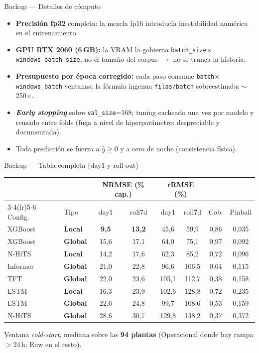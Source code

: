 \documentclass[10pt,aspectratio=169]{beamer}
\newcommand{\gl}[1]{\textcolor{glob}{\textbf{#1}}}
\newcommand{\lo}[1]{\textcolor{loc}{\textbf{#1}}}
\begin{document}
\begin{frame}{Backup --- Detalles de cómputo}
  \begin{itemize}
    \item \textbf{Precisión fp32} completa: la mezcla fp16 introducía inestabilidad numérica en el entrenamiento.
    \item \textbf{GPU RTX 2060 (6\,GB):} la VRAM la gobierna \texttt{batch\_size}$\times$\texttt{windows\_batch\_size}, no el tamaño del corpus $\rightarrow$ no se trunca la historia.
    \item \textbf{Presupuesto por época corregido:} cada paso consume \texttt{batch}$\times$\texttt{windows\_batch} ventanas; la fórmula ingenua \texttt{filas/batch} sobreestimaba $\sim$250$\times$.
    \item \textbf{\emph{Early stopping}} sobre \texttt{val\_size}=168; tuning cacheado una vez por modelo y reusado entre folds (fuga a nivel de hiperparámetro: despreciable y documentada).
    \item Toda predicción se fuerza a $\hat{y}\geq 0$ y a cero de noche (consistencia física).
  \end{itemize}
\end{frame}

\begin{frame}{Backup --- Tabla completa (day1 y roll-out)}
  \scriptsize
  \begin{center}
  \begin{tabular}{llcccccc}
    \toprule
     & & \multicolumn{2}{c}{NRMSE (\% cap.)} & \multicolumn{2}{c}{rRMSE (\%)} & & \\
    \cmidrule(lr){3-4}\cmidrule(lr){5-6}
    Config. & Tipo & day1 & roll7d & day1 & roll7d & Cob. & Pinball \\
    \midrule
    XGBoost  & \lo{Local}  & \textbf{9,5} & \textbf{13,2} & 45,6 & 59,9 & 0,86 & 0,035 \\
    XGBoost  & \gl{Global} & 15,6 & 17,1 & 64,0 & 75,1 & 0,97 & 0,092 \\
    N-HiTS   & \lo{Local}  & 14,2 & 17,6 & 62,3 & 85,2 & 0,72 & 0,096 \\
    Informer & \gl{Global} & 21,0 & 22,8 & 96,6 & 106,5 & 0,64 & 0,115 \\
    TFT      & \gl{Global} & 22,0 & 23,6 & 105,1 & 112,7 & 0,38 & 0,158 \\
    LSTM     & \lo{Local}  & 16,3 & 23,9 & 102,6 & 128,8 & 0,72 & 0,235 \\
    LSTM     & \gl{Global} & 22,6 & 24,8 & 99,7 & 108,6 & 0,53 & 0,159 \\
    N-HiTS   & \gl{Global} & 28,6 & 30,7 & 129,8 & 148,2 & 0,37 & 0,372 \\
    \bottomrule
  \end{tabular}
  \end{center}
  \normalsize
  \centering Ventana \emph{cold-start}, mediana sobre las \textbf{94 plantas}
  (Operacional donde hay rampa $>$24\,h; Raw en el resto).
\end{frame}
\end{document}
